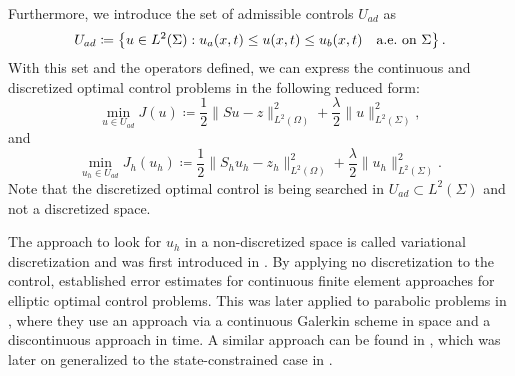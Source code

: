 \documentclass[../thesis.tex]{subfiles}
\begin{document}
Furthermore, we introduce the set of admissible controls $U_{ad}$ as
\[
	U_{ad} \coloneqq \left\{ u \in L^2(\Sigma) \mathrel{}:\mathrel{} u_a(x, t) \leq u(x, t) \leq u_b(x, t) \quad \text{a.e.\ on $\Sigma$} \right\}.
\]
With this set and the operators defined, we can express the continuous and discretized optimal control problems in the following reduced form:
\begin{equation}
\label{eq:f-S}
\min_{u \in U_{ad}} J(u) \coloneqq \frac{1}{2} \| S u - z \|_{L^2(\Omega)}^2 + \frac{\lambda}{2} \| u \|_{L^2(\Sigma)}^2,
\end{equation}
and
\begin{equation}
\label{eq:f-Sh}
\min_{u_h \in U_{ad}} J_h(u_h) \coloneqq \frac{1}{2} \| S_h u_h - z_h \|_{L^2(\Omega)}^2 + \frac{\lambda}{2} \| u_h \|_{L^2(\Sigma)}^2.
\end{equation}
Note that the discretized optimal control is being searched in $U_{ad} \subset L^2(\Sigma)$ and not a discretized space.

The approach to look for $u_h$ in a non-discretized space is called variational discretization and was first introduced in \cite{Hinze}.
By applying no discretization to the control, \cite{Hinze} established error estimates for continuous finite element approaches for elliptic optimal control problems. This was later applied to parabolic problems in \cite{DeckelnickHinze}, where they use an approach via a continuous Galerkin scheme in space and a discontinuous approach in time. A similar approach can be found in \cite{MeidnerVexler-I}, which was later on generalized to the state-constrained case in \cite{MeidnerVexler-II}.
\end{document}
